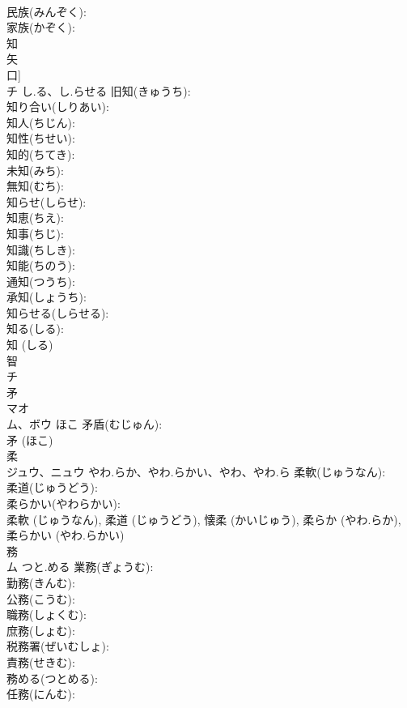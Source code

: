 \documentclass[8pt]{extreport}
\begin{document}
\begin{CJK}{UTF8}{min}
\\	民族(みんぞく): 
\\	家族(かぞく): 
\\	知			
\\	矢 
\\	口] 
\\	チ	し.る、し.らせる	旧知(きゅうち): 
\\	知り合い(しりあい): 
\\	知人(ちじん): 
\\	知性(ちせい): 
\\	知的(ちてき): 
\\	未知(みち): 
\\	無知(むち): 
\\	知らせ(しらせ): 
\\	知恵(ちえ): 
\\	知事(ちじ): 
\\	知識(ちしき): 
\\	知能(ちのう): 
\\	通知(つうち): 
\\	承知(しょうち): 
\\	知らせる(しらせる): 
\\	知る(しる): 
\\	知 (しる)
\\	智			
\\	チ			
\\	矛			
\\	マオ 
\\	ム、ボウ	ほこ	矛盾(むじゅん): 
\\	矛 (ほこ)
\\	柔			
\\	ジュウ、ニュウ	やわ.らか、やわ.らかい、やわ、やわ.ら	柔軟(じゅうなん): 
\\	柔道(じゅうどう): 
\\	柔らかい(やわらかい): 
\\	柔軟 (じゅうなん), 柔道 (じゅうどう), 懐柔 (かいじゅう), 柔らか (やわ.らか), 柔らかい (やわ.らかい)
\\	務			
\\	ム	つと.める	業務(ぎょうむ): 
\\	勤務(きんむ): 
\\	公務(こうむ): 
\\	職務(しょくむ): 
\\	庶務(しょむ): 
\\	税務署(ぜいむしょ): 
\\	責務(せきむ): 
\\	務める(つとめる): 
\\	任務(にんむ): 

\end{CJK}
\end{document}
